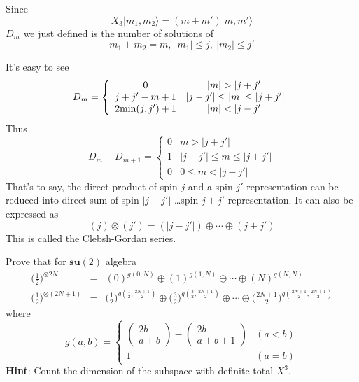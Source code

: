 \documentclass[12pt]{book}
\begin{document}
	Since
	\begin{equation}
		X_3|m_1,m_2\rangle=(m+m')|m,m'\rangle
	\end{equation}
	$D_m$ we just defined is the number of solutions of
	\begin{equation}
		m_1+m_2=m,\ |m_1|\leq j,\ |m_2|\leq j'
	\end{equation}
	
	It's easy to see
	\begin{equation}
		D_m=\left\{\begin{array}{cc}
		0&|m|>|j+j'|\\
		j+j'-m+1&|j-j'|\leq|m|\leq|j+j'|\\
		2{\rm min}(j,j')+1&|m|<|j-j'|
		\end{array}\right.
	\end{equation}
	Thus
	\begin{equation}
		D_m-D_{m+1}=\left\{\begin{array}{cc}
		0&m>|j+j'|\\
		1&|j-j'|\leq m\leq|j+j'|\\
		0&0\leq m<|j-j'|
		\end{array}\right.
	\end{equation}
	That's to say, the direct product of spin-$j$ and a spin-$j'$ representation can be reduced into direct sum of spin-$|j-j'|$ \dots spin-$j+j'$ representation. It can also be expressed as 
	\begin{equation}
		(j)\otimes(j')=(|j-j'|)\oplus\cdots\oplus(j+j')
	\end{equation}
	This is called the Clebsh-Gordan series.
	
	
	
	
		Prove that for $\textbf{su}(2)$ algebra
		\begin{eqnarray}
		\Big(\frac 12\Big)^{\otimes 2N}&=&(0)^{g(0,N)}\oplus(1)^{g(1,N)}\oplus\cdots\oplus(N)^{g(N,N)}\\
		\Big(\frac 12\Big)^{\otimes(2N+1)}&=&\Big(\frac 12\Big)^{g(\frac 12,\frac {2N+1}2)}\oplus\Big(\frac 32\Big)^{g(\frac 32,\frac {2N+1}2)}\oplus\cdots\oplus\Big(\frac {2N+1}2\Big)^{g(\frac {2N+1}2,\frac {2N+1}2)}
		\end{eqnarray}
		where
		\begin{equation}
		g(a,b)=\left\{\begin{array}{ll}
		\left(\begin{array}{c}2b\\a+b\end{array}\right)-\left(\begin{array}{c}2b\\a+b+1\end{array}\right)&(a<b)\\
		1&(a=b)
		\end{array}\right.
		\end{equation}
		\textbf{Hint}: Count the dimension of the subspace with definite total $X^3$.

	
	
	
	
	
	
	
	
	
	
	
	
	
	
	
	
	\printindex
	
\end{document}
